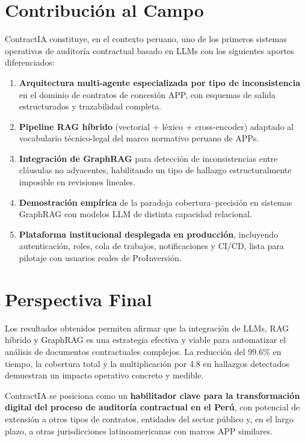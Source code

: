 \section*{Contribución al Campo}

ContractIA constituye, en el contexto peruano, uno de los primeros sistemas
operativos de auditoría contractual basado en LLMs con los siguientes aportes
diferenciados:

\begin{enumerate}
    \item \textbf{Arquitectura multi-agente especializada por tipo de
    inconsistencia} en el dominio de contratos de concesión APP, con esquemas
    de salida estructurados y trazabilidad completa.
    \item \textbf{Pipeline RAG híbrido} (vectorial + léxico + cross-encoder)
    adaptado al vocabulario técnico-legal del marco normativo peruano de APPs.
    \item \textbf{Integración de GraphRAG} para detección de inconsistencias
    entre cláusulas no adyacentes, habilitando un tipo de hallazgo
    estructuralmente imposible en revisiones lineales.
    \item \textbf{Demostración empírica} de la paradoja cobertura--precisión
    en sistemas GraphRAG con modelos LLM de distinta capacidad relacional.
    \item \textbf{Plataforma institucional desplegada en producción},
    incluyendo autenticación, roles, cola de trabajos, notificaciones y
    CI/CD, lista para pilotaje con usuarios reales de ProInversión.
\end{enumerate}

\section*{Perspectiva Final}

Los resultados obtenidos permiten afirmar que la integración de LLMs,
RAG híbrido y GraphRAG es una estrategia efectiva y viable para automatizar
el análisis de documentos contractuales complejos. La reducción del 99.6\%
en tiempo, la cobertura total y la multiplicación por 4.8 en hallazgos
detectados demuestran un impacto operativo concreto y medible.

ContractIA se posiciona como un \textbf{habilitador clave para la
transformación digital del proceso de auditoría contractual en el Perú},
con potencial de extensión a otros tipos de contratos, entidades del
sector público y, en el largo plazo, a otras jurisdicciones
latinoamericanas con marcos APP similares.
